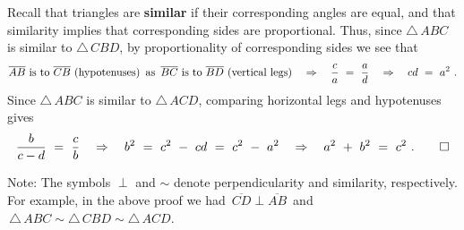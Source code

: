 \par\noindent Recall that triangles are \textbf{similar} if their
corresponding angles are equal, and that similarity implies that corresponding sides are
proportional. Thus, since $\triangle\,ABC$ is similar to $\triangle\,CBD$, by proportionality of
corresponding sides we see that
\begin{displaymath}
 \overline{AB}~\text{is to}~\overline{CB}~\text{(hypotenuses)}\enskip\text{as}\enskip
 \overline{BC}~\text{is to}~\overline{BD}~\text{(vertical legs)}
 \quad\Rightarrow\quad \frac{c}{a} ~=~ \frac{a}{d} \quad\Rightarrow\quad cd ~=~ a^2 ~.
\end{displaymath}
Since $\triangle\,ABC$ is similar to $\triangle\,ACD$, comparing horizontal legs and hypotenuses
gives
\begin{displaymath}
 \frac{b}{c-d} ~=~ \frac{c}{b} \quad\Rightarrow\quad b^2 ~=~ c^2 ~-~ cd ~=~ c ^2 ~-~ a^2
 \quad\Rightarrow\quad a^2 ~+~ b^2 ~=~ c^2 ~. \qed
\end{displaymath}
\par\noindent Note: The symbols $\perp$\index{$\perp$} and $\sim$\index{$\sim$} denote
perpendicularity and similarity, respectively. For example, in the above
proof we had $\,\overline{CD} \perp \overline{AB}\,$ and
$\,\triangle\,ABC \sim \triangle\,CBD \sim \triangle\,ACD$.
\newpage
